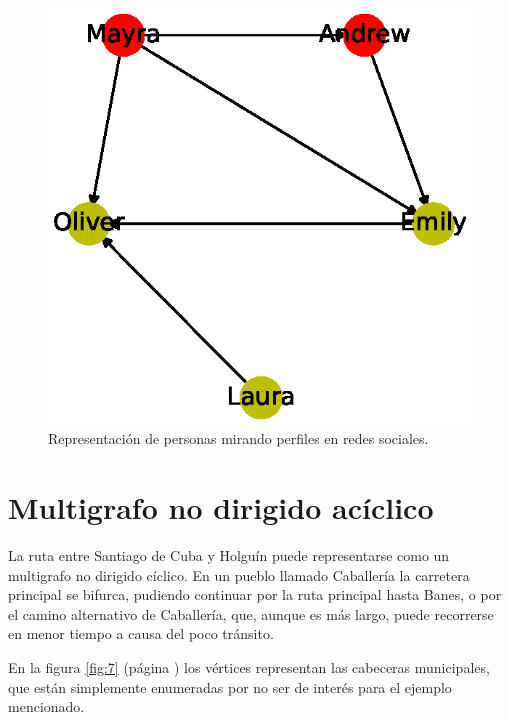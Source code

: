 \documentclass{article}
\begin{document}

\begin{figure}
  \includegraphics[width=.8\columnwidth]{6.eps}
  \vspace*{-8mm}
  \caption{Representación de personas mirando perfiles en redes sociales.}
  \label{fig:6}
\end{figure}

\section{Multigrafo no dirigido acíclico}

La ruta entre Santiago de Cuba y Holguín puede representarse  como un multigrafo no dirigido cíclico. En un pueblo llamado Caballería la carretera principal se bifurca, pudiendo continuar por la ruta principal hasta Banes, o por el camino alternativo de Caballería, que, aunque es más largo, puede recorrerse en menor tiempo a causa del poco tránsito.

En la figura \ref{fig:7} (página \pageref{fig:7}) los vértices representan las cabeceras municipales, que están simplemente enumeradas por no ser de interés para el ejemplo mencionado.
\end{document}
